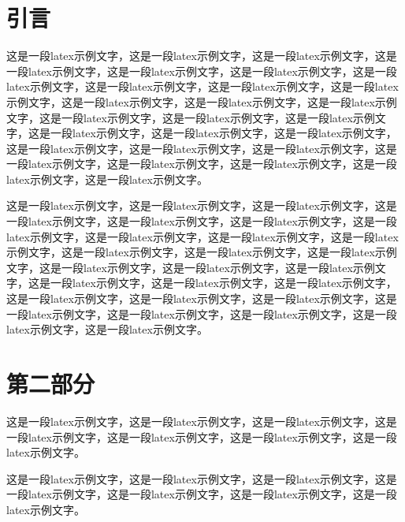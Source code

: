 \documentclass{template} %
\begin{document}
\begin{multicols}{2}

    \section{引言}
这是一段latex示例文字\cite{reddy2013polypharmacology}，这是一段latex示例文字，这是一段latex示例文字，这是一段latex示例文字，这是一段latex示例文字，这是一段latex示例文字，这是一段latex示例文字，这是一段latex示例文字，这是一段latex示例文字，这是一段latex示例文字，这是一段latex示例文字，这是一段latex示例文字，这是一段latex示例文字，这是一段latex示例文字，这是一段latex示例文字，这是一段latex示例文字，这是一段latex示例文字，这是一段latex示例文字，这是一段latex示例文字，这是一段latex示例文字，这是一段latex示例文字，这是一段latex示例文字，这是一段latex示例文字，这是一段latex示例文字，这是一段latex示例文字，这是一段latex示例文字，这是一段latex示例文字。

这是一段latex示例文字\cite{li2020learn}，这是一段latex示例文字，这是一段latex示例文字，这是一段latex示例文字，这是一段latex示例文字，这是一段latex示例文字，这是一段latex示例文字，这是一段latex示例文字，这是一段latex示例文字，这是一段latex示例文字，这是一段latex示例文字，这是一段latex示例文字，这是一段latex示例文字，这是一段latex示例文字，这是一段latex示例文字，这是一段latex示例文字，这是一段latex示例文字，这是一段latex示例文字，这是一段latex示例文字，这是一段latex示例文字，这是一段latex示例文字，这是一段latex示例文字，这是一段latex示例文字，这是一段latex示例文字，这是一段latex示例文字，这是一段latex示例文字，这是一段latex示例文字。


    \section{第二部分}
这是一段latex示例文字\cite{reddy2013polypharmacology}，这是一段latex示例文字，这是一段latex示例文字，这是一段latex示例文字，这是一段latex示例文字，这是一段latex示例文字，这是一段latex示例文字。

这是一段latex示例文字\cite{li2020learn}，这是一段latex示例文字，这是一段latex示例文字，这是一段latex示例文字，这是一段latex示例文字，这是一段latex示例文字，这是一段latex示例文字。
    

\end{multicols}
\end{document}
